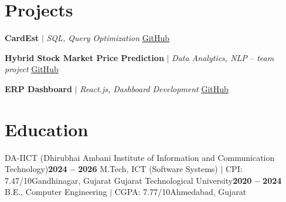 \documentclass[letterpaper,10pt]{article}
\begin{document}
\vspace{-0.5em}
\section{Projects}
\resumeSubHeadingListStart

    \resumeProjectHeading
    {\textbf{CardEst} $|$ \emph{SQL, Query Optimization}}
    {\href{https://github.com/VEDANG2024/ddb-project}{\underline{\footnotesize GitHub}}}
    \resumeItemListStart
    \resumeItemListEnd

    \resumeProjectHeading
    {\textbf{Hybrid Stock Market Price Prediction} $|$ \emph{Data Analytics, NLP} -- \emph{team project}}
    {\href{https://github.com/VEDANG2024/STOCK-MARKET-ML/tree/main/Stock-Market-Prediction-main}{\underline{\footnotesize GitHub}}}
    \resumeItemListStart
    \resumeItemListEnd

    \resumeProjectHeading
    {\textbf{ERP Dashboard} $|$ \emph{React.js, Dashboard Development}}
    {\href{https://github.com/VEDANG2024/erp-master}{\underline{\footnotesize GitHub}}}
    \resumeItemListStart
    \resumeItemListEnd

\resumeSubHeadingListEnd
\section{Education}
\resumeSubHeadingListStart
    \resumeSubheading
    {DA-IICT (Dhirubhai Ambani Institute of Information and Communication Technology)}{\textbf{2024 -- 2026}}
    {M.Tech, ICT (Software Systems) $\vert$ CPI: 7.47/10}{Gandhinagar, Gujarat}
    \resumeSubheading
    {Gujarat Technological University}{\textbf{2020 -- 2024}}
    {B.E., Computer Engineering $\vert$ CGPA: 7.77/10}{Ahmedabad, Gujarat}
\resumeSubHeadingListEnd

\vspace{-0.5em}
\end{document}
